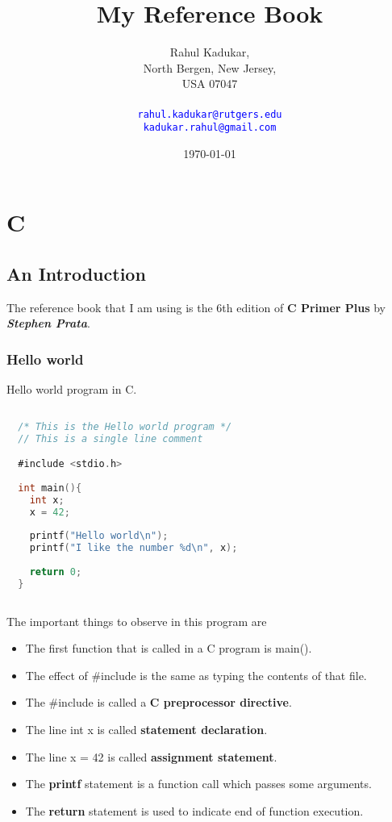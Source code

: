 \documentclass[11pt,a4paper,oneside]{book}
\begin{document}
\title{My Reference Book}
\author{
Rahul Kadukar, \\
North Bergen, New Jersey, \\
USA 07047 \\
\\
\texttt{\textcolor{blue}{rahul.kadukar@rutgers.edu}} \\
\texttt{\textcolor{blue}{kadukar.rahul@gmail.com}}
}
\date{\today}
\maketitle
\begingroup
\let\cleardoublepage\clearpage
\tableofcontents
\endgroup

\part{C}
\chapter{An Introduction}
The reference book that I am using is the 6th edition of \textbf{C Primer Plus}
by \textit{\textbf {Stephen Prata}}.
\section{Hello world}
Hello world program in C.
\begin{lstlisting}[title=Hello world program, language=C]
  
  /* This is the Hello world program */
  // This is a single line comment

  #include <stdio.h>
  
  int main(){
    int x;
    x = 42;  
    
    printf("Hello world\n");
    printf("I like the number %d\n", x);
    
    return 0;
  }
  
\end{lstlisting}

\noindent The important things to observe in this program are
\begin{itemize}
  \itemsep-3pt
  \item The first function that is called in a C program is main().
  \item The effect of \#include is the same as typing the contents of that file.
  \item The \#include is called a \textbf{C preprocessor directive}.
  \item The line int x is called \textbf{statement declaration}.
  \item The line x = 42 is called \textbf{assignment statement}.
  \item The \textbf{printf} statement is a function call which passes some arguments.
  \item The \textbf{return} statement is used to indicate end of function execution.
\end{itemize}
\end{document}
